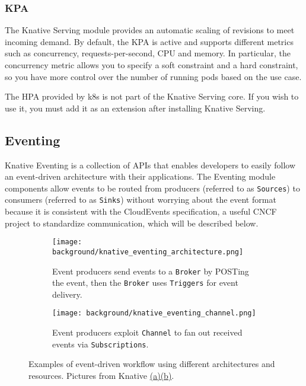 \documentclass[../thesis.tex]{subfiles}
\begin{document}
\subsubsection{\acrfull*{KPA}}
The Knative Serving module provides an automatic scaling of revisions to meet incoming demand. By default, the \acrshort{KPA} is active and supports different metrics such as concurrency, requests-per-second, CPU and memory. In particular, the concurrency metric allows you to specify a soft constraint and a hard constraint, so you have more control over the number of running \gls{pod}s based on the use case.

The \acrfull{HPA} provided by \gls{k8s} is not part of the Knative Serving core. If you wish to use it, you must add it as an extension after installing Knative Serving.

\subsection{Eventing}
Knative Eventing is a collection of \acrshort{API}s that enables developers to easily follow an event-driven architecture with their applications. The Eventing module components allow events to be routed from producers (referred to as \texttt{Sources}) to consumers (referred to as \texttt{Sinks}) without worrying about the event format because it is consistent with the CloudEvents specification, a useful \acrshort{CNCF} project to standardize communication, which will be described below.

\begin{figure}[H]
    \centering
    \begin{subfigure}[t]{.9\textwidth}
        \centering
        \texttt{[image: background/knative\_eventing\_architecture.png]}
        \caption{Event producers send events to a \texttt{Broker} by POSTing the event, then the \texttt{Broker} uses \texttt{Triggers} for event delivery.}
        \label{fig:knative_eventing_broker}
    \end{subfigure}
    \vfill
    \begin{subfigure}[t]{.9\textwidth}
        \centering
        \texttt{[image: background/knative\_eventing\_channel.png]}
        \caption{Event producers exploit \texttt{Channel} to fan out received events via \texttt{Subscriptions}.}
        \label{fig:knative_eventing_channel}
    \end{subfigure}
    \caption[Event-driven workflow examples]{Examples of event-driven workflow using different architectures and resources. Pictures from Knative \href{https://knative.dev/docs/eventing/brokers/}{(a)}\href{https://knative.dev/docs/eventing/channels/}{(b)}.}
    \label{fig:knative_eventing_architecture}
\end{figure}
\end{document}
